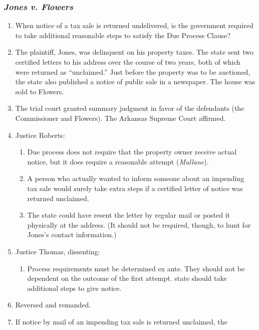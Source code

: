\subsubsection{\emph{Jones v. Flowers}}

\begin{enumerate}
    \item When notice of a tax sale is returned undelivered, is the government
    required to take additional reasonable steps to satisfy the Due Process
    Clause?
    \item The plaintiff, Jones, was delinquent on his property taxes. The 
    state
    sent two certified letters to his address over the course of two years,
    both of which were returned as ``unclaimed.'' Just before the property
    was to be auctioned, the state also published a notice of public sale in
    a newspaper. The house was sold to Flowers.
    \item The trial court granted summary judgment in favor of the defendants 
    (the
    Commissioner and Flowers). The Arkansas Supreme Court affirmed.
    \item Justice Roberts:
    \begin{enumerate}
        \item Due process does not require that the property owner receive 
        actual
          notice, but it does require a reasonable attempt (\emph{Mullane}).
        \item A person who actually wanted to inform someone about an 
        impending tax
          sale would surely take extra steps if a certified letter of notice 
          was
          returned unclaimed.
        \item The state could have resent the letter by regular mail or posted 
        it
          physically at the address. (It should not be required, though, to 
          hunt
          for Jones's contact information.)
    \end{enumerate}
    \item Justice Thomas, dissenting:
    \begin{enumerate}
        \item Process requirements must be determined ex ante. They should not 
        be
          dependent on the outcome of the first attempt.
          state should take additional steps to give notice.
    \end{enumerate}
    \item Reversed and remanded.
    \item If notice by mail of an impending tax sale is returned unclaimed, 
    the
\end{enumerate}

